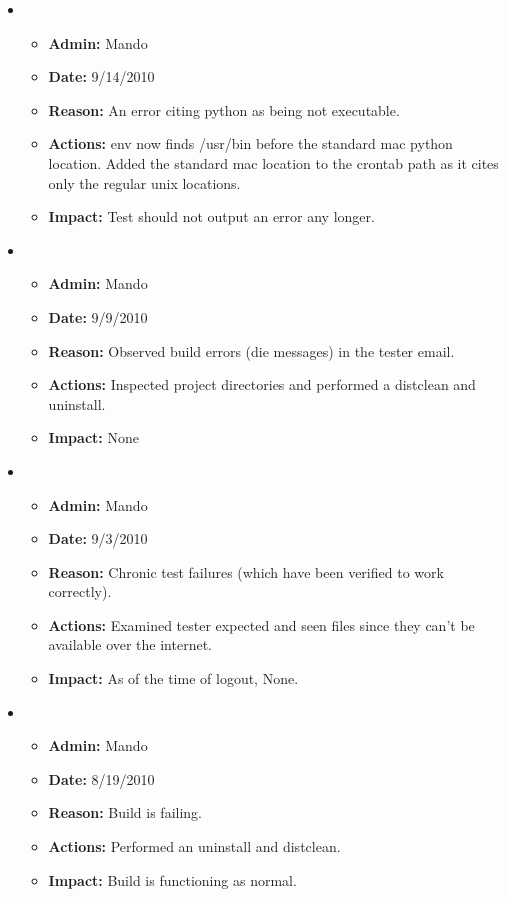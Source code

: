 \documentclass[12pt]{article}
\begin{document}
\begin{itemize}

\item 
\begin{itemize}
\item[] {\bf Admin:} Mando
\item[] {\bf Date:} 9/14/2010
\item[] {\bf Reason:} An error citing python as being not executable. 
\item[] {\bf Actions:} env now finds /usr/bin before the standard mac python location. Added the standard mac location to the crontab path as it cites only the regular unix locations.
\item[] {\bf Impact:} Test should not output an error any longer.
\end{itemize}
	
\item 
\begin{itemize}
\item[] {\bf Admin:} Mando
\item[] {\bf Date:} 9/9/2010
\item[] {\bf Reason:} Observed build errors (die messages) in the tester email. 
\item[] {\bf Actions:} Inspected project directories and performed a distclean and uninstall.
\item[] {\bf Impact:} None
\end{itemize}

\item 
\begin{itemize}
\item[] {\bf Admin:} Mando
\item[] {\bf Date:} 9/3/2010
\item[] {\bf Reason:} Chronic test failures (which have been verified to work correctly). 
\item[] {\bf Actions:} Examined tester expected and seen files since they can't be available over the internet.
\item[] {\bf Impact:} As of the time of logout, None.
\end{itemize}
	
\item 
\begin{itemize}
\item[] {\bf Admin:} Mando
\item[] {\bf Date:} 8/19/2010
\item[] {\bf Reason:} Build is failing. 
\item[] {\bf Actions:} Performed an uninstall and distclean.
\item[] {\bf Impact:} Build is functioning as normal.
\end{itemize}
	

\end{itemize}
\end{document}
